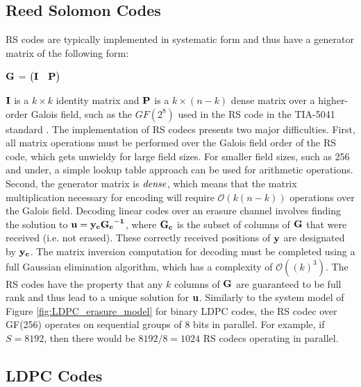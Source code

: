 \documentclass[conference]{IEEEtran}
\begin{document}
\subsection{Reed Solomon Codes}\label{sec_RS}

RS codes are typically implemented in systematic form and thus have a generator matrix of the following form:

$\bf{G}$ =
$\begin{pmatrix}
 \bf{I} & \bf{P}\\
\end{pmatrix}$

$\bf{I}$ is a $k \times k$ identity matrix and $\bf{P}$ is a $k \times (n-k)$ dense matrix over a higher-order Galois field, such as the $GF(2^8)$ used in the RS code in the TIA-5041 standard \cite{TIA5041_standard}.
The implementation of RS codecs presents two major difficulties.  First, all matrix operations must be performed over the Galois field order of the RS code, which gets unwieldy for large field sizes.  For smaller field sizes, such as 256 and under, a simple lookup table approach can be used for arithmetic operations.  Second, the generator matrix is $\it{dense}$, which means that the matrix multiplication necessary for encoding will require $\mathcal O(k(n-k))$ operations over the Galois field.  Decoding linear codes over an erasure channel involves finding the solution to $\bf{u} = \bf{y}_c{\bf{G}_c}^{-1}$, where $\bf{G}_c$ is the subset of columns of $\bf{G}$ that were received (i.e. not erased).  These correctly received positions of $\bf{y}$ are designated by $\bf{y}_c$.  The matrix inversion computation for decoding must be completed using a full Gaussian elimination algorithm, which has a complexity of $\mathcal O((k)^3)$.  The RS codes have the property that any $k$ columns of $\bf{G}$ are guaranteed to be full rank and thus lead to a unique solution for $\bf{u}$.  Similarly to the system model of Figure \ref{fig:LDPC_erasure_model} for binary LDPC codes, the RS codec over GF(256) operates on sequential groups of 8 bits in parallel.  For example, if $S=8192$, then there would be $8192/8=1024$ RS codecs operating in parallel.

\subsection{LDPC Codes}
\end{document}

